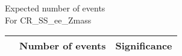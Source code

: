 \begin{frame}{Expected number of events \\ For CR\_SS\_ee\_Zmass}
\vspace{5mm}
\begin{tabular}{|c|c|c|}
\hline
& Number of events & Significance \\
\hline

\end{tabular}
\end{frame}

